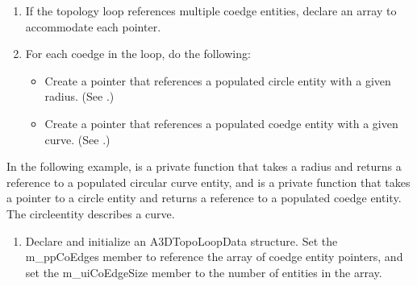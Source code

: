 \documentclass[letterpaper,12pt,english,openany,oneside]{sphinxmanual}
\begin{document}
\begin{sphinxVerbatim}[commandchars=\\\{\}]
   
\end{sphinxVerbatim}
\begin{enumerate}
%
\setcounter{enumi}{1}
\item {} 
If the topology loop references multiple co\sphinxhyphen{}edge entities, declare an array to accommodate each pointer.

\item {} 
For each co\sphinxhyphen{}edge in the loop, do the following:
\begin{itemize}
\item {} 
Create a pointer that references a populated circle entity with a given radius. (See .)

\item {} 
Create a pointer that references a populated co\sphinxhyphen{}edge entity with a given curve. (See .)

\end{itemize}

\end{enumerate}

In the following example,  is a private function that takes a radius and returns a reference to a populated circular curve entity, and  is a private function that takes a pointer to a circle entity and returns a reference to a populated co\sphinxhyphen{}edge entity. The circle\sphinxhyphen{}entity describes a curve.

\begin{sphinxVerbatim}[commandchars=\\\{\}]
   
   
\end{sphinxVerbatim}
\begin{enumerate}
%
\setcounter{enumi}{3}
\item {} 
Declare and initialize an A3DTopoLoopData structure. Set the m\_ppCoEdges member to reference the array of co\sphinxhyphen{}edge entity pointers, and set the m\_uiCoEdgeSize member to the number of entities in the array.

\end{enumerate}
\end{document}
